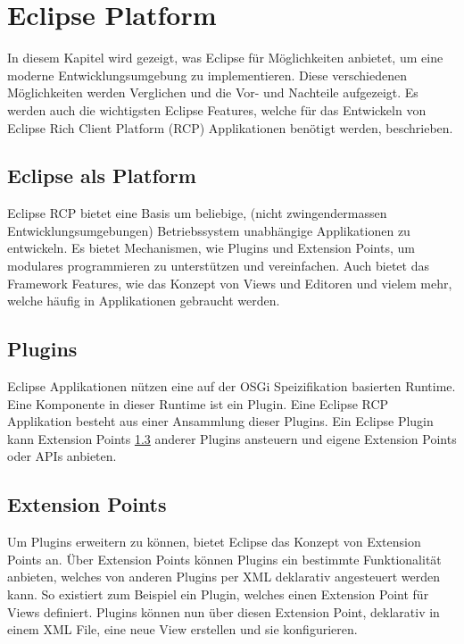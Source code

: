 \chapter{Eclipse Platform}
\label{sec:EclipsePlatform}

In diesem Kapitel wird gezeigt, was Eclipse für Möglichkeiten anbietet, um eine moderne Entwicklungsumgebung zu implementieren. Diese verschiedenen Möglichkeiten werden Verglichen und die Vor- und Nachteile aufgezeigt. Es werden auch die wichtigsten Eclipse Features, welche für das Entwickeln von Eclipse Rich Client Platform (RCP) Applikationen benötigt werden, beschrieben.

\section{Eclipse als Platform}

Eclipse RCP bietet eine Basis um beliebige, (nicht zwingendermassen Entwicklungsumgebungen) Betriebssystem unabhängige Applikationen zu entwickeln. Es bietet Mechanismen, wie Plugins und Extension Points, um modulares programmieren zu unterstützen und vereinfachen. Auch bietet das Framework Features, wie das Konzept von Views und Editoren und vielem mehr, welche häufig in Applikationen gebraucht werden.

\section{Plugins}

Eclipse Applikationen nützen eine auf der OSGi Speizifikation basierten Runtime. Eine Komponente in dieser Runtime ist ein Plugin. Eine Eclipse RCP Applikation besteht aus einer Ansammlung dieser Plugins. Ein Eclipse Plugin kann Extension Points \ref{extensionpointssection} anderer Plugins ansteuern und eigene Extension Points oder APIs anbieten.

\section{Extension Points}
\label{extensionpointssection}

Um Plugins erweitern zu können, bietet Eclipse das Konzept von Extension Points an. Über Extension Points können Plugins ein bestimmte Funktionalität anbieten, welches von anderen Plugins per XML deklarativ angesteuert werden kann. 
\newline
So existiert zum Beispiel ein Plugin, welches einen Extension Point für Views definiert. Plugins können nun über diesen Extension Point, deklarativ in einem XML File, eine neue View erstellen und sie konfigurieren. \cite{extensionpoints}


